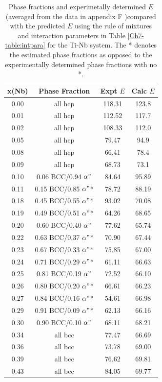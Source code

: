 \newpage
\begin{table}[H]
	\caption{Phase fractions and experimetally determined $E$ (averaged from the data in appendix F \cite{Friak2012,Timoshevskii2011,Friak2012,Karre2015})compared with the predicted $E$ using the rule of mixtures and interaction parameters in Table \ref{Ch7-table:intpara} for the Ti-Nb system. The * denotes the estimated phase fractions as opposed to the experimentally determined phase fractions with no *.}
	\centering
	\begin{tabular}{ c c c c}
		\hline
		x(Nb) & Phase Fraction & Expt $E$ & Calc $E$\\
		\hline
		0.00 & all hcp & 118.31 & 123.8\\
		0.01 & all hcp & 112.52 & 117.7\\
		0.02 & all hcp & 108.33 & 112.0\\
		0.05 & all hcp & 79.47 & 94.9\\
		0.08 & all hcp & 66.41 & 78.4\\
		0.09 & all hcp & 68.73 & 73.1\\
		0.10 & 0.06 BCC/0.94 $\alpha"$ & 84.64 & 95.89\\
		0.11 & 0.15 BCC/0.85 $\alpha"$* & 78.72 & 88.19\\
		0.18 & 0.45 BCC/0.55 $\alpha"$* & 93.02 & 70.08\\
		0.19 & 0.49 BCC/0.51 $\alpha"$* & 64.26 & 68.65\\
		0.20 & 0.60 BCC/0.40 $\alpha"$ & 77.62 & 65.74\\
		0.22 & 0.63 BCC/0.37 $\alpha"$* & 70.90 & 67.44\\
		0.23 & 0.67 BCC/0.33 $\alpha"$* & 75.85 & 67.00\\
		0.24 & 0.71 BCC/0.29 $\alpha"$* & 61.11 & 66.63\\
		0.25 & 0.81 BCC/0.19 $\alpha"$ & 72.52 & 66.10\\
		0.26 & 0.80 BCC/0.20 $\alpha"$* & 66.61 & 66.23\\
		0.27 & 0.84 BCC/0.16 $\alpha"$* & 54.61 & 66.98\\
		0.29 & 0.91 BCC/0.09 $\alpha"$* & 62.13 & 66.16\\
		0.30 & 0.90 BCC/0.10 $\alpha"$ & 68.11 & 68.21\\
		0.34 & all bcc & 77.47 & 66.69\\
		0.36 & all bcc & 73.78 & 69.00\\
		0.39 & all bcc & 76.62 & 69.81\\
		0.43 & all bcc & 84.05 & 69.77\\
		\hline
	\end{tabular}
	\label{Ch7-table:elasexptdata}
\end{table}
\clearpage

